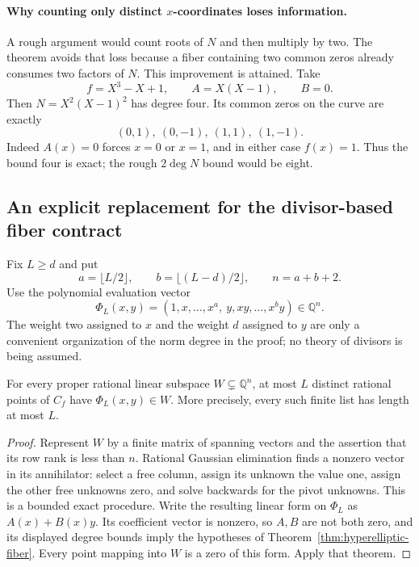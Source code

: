 \paragraph{Why counting only distinct $x$-coordinates loses information.}
A rough argument would count roots of $N$ and then multiply by two.  The
theorem avoids that loss because a fiber containing two common zeros
already consumes two factors of $N$.  This improvement is attained.
Take
\[
       f=X^3-X+1,\qquad A=X(X-1),\qquad B=0.
\]
Then $N=X^2(X-1)^2$ has degree four.  Its common zeros on the curve are
exactly
\[
                  (0,1),\ (0,-1),\ (1,1),\ (1,-1).
\]
Indeed $A(x)=0$ forces $x=0$ or $x=1$, and in either case $f(x)=1$.
Thus the bound four is exact; the rough $2\deg N$ bound would be eight.

\subsection{An explicit replacement for the divisor-based fiber contract}

Fix $L\ge d$ and put
\[
 a=\lfloor L/2\rfloor,\qquad b=\lfloor(L-d)/2\rfloor,\qquad
 n=a+b+2.
\]
Use the polynomial evaluation vector
\[
 \Phi_L(x,y)=(1,x,\ldots,x^a,\ y,xy,\ldots,x^b y)
                      \in\mathbb Q^n.
\]
The weight two assigned to $x$ and the weight $d$ assigned to $y$
are only a convenient organization of the norm degree in the proof;
no theory of divisors is being assumed.

\begin{corollary}
\label{cor:subspace-fiber}
For every proper rational linear subspace $W\subsetneq\mathbb Q^n$,
at most $L$ distinct rational points of $C_f$ have $\Phi_L(x,y)\in W$.
More precisely, every such finite list has length at most $L$.
\end{corollary}

\begin{proof}
Represent $W$ by a finite matrix of spanning vectors and the assertion
that its row rank is less than $n$.  Rational Gaussian elimination finds
a nonzero vector in its annihilator: select a free column, assign its
unknown the value one, assign the other free unknowns zero, and solve
backwards for the pivot unknowns.  This is a bounded exact procedure.
Write the resulting linear form on $\Phi_L$ as $A(x)+B(x)y$.
Its coefficient vector is nonzero, so $A,B$ are not both zero, and
its displayed degree bounds imply the hypotheses of
Theorem~\ref{thm:hyperelliptic-fiber}.  Every point mapping into $W$
is a zero of this form.  Apply that theorem.
\end{proof}

